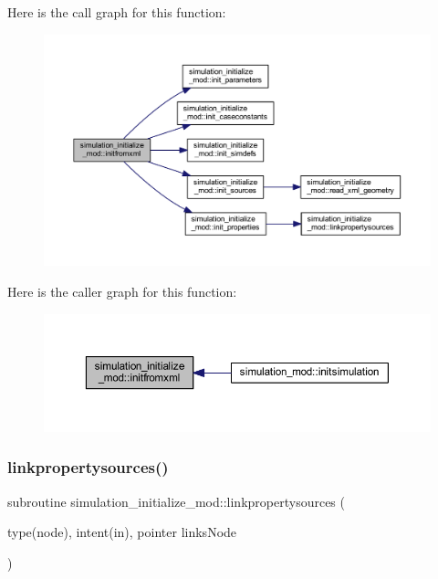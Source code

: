 Here is the call graph for this function\+:
\nopagebreak
\begin{figure}[H]
\begin{center}
\leavevmode
\includegraphics[width=350pt]{namespacesimulation__initialize__mod_aa596874d438807298121982eaa129d3a_cgraph}
\end{center}
\end{figure}
Here is the caller graph for this function\+:
\nopagebreak
\begin{figure}[H]
\begin{center}
\leavevmode
\includegraphics[width=350pt]{namespacesimulation__initialize__mod_aa596874d438807298121982eaa129d3a_icgraph}
\end{center}
\end{figure}
\mbox{\label{namespacesimulation__initialize__mod_a695ed61242e902d50bc40b83a6d11f65}} 
\subsubsection{\texorpdfstring{linkpropertysources()}{linkpropertysources()}}
{\footnotesize\ttfamily subroutine simulation\+\_\+initialize\+\_\+mod\+::linkpropertysources (\begin{DoxyParamCaption}\item[{type(node), intent(in), pointer}]{links\+Node }\end{DoxyParamCaption})\hspace{0.3cm}{\ttfamily [private]}}



